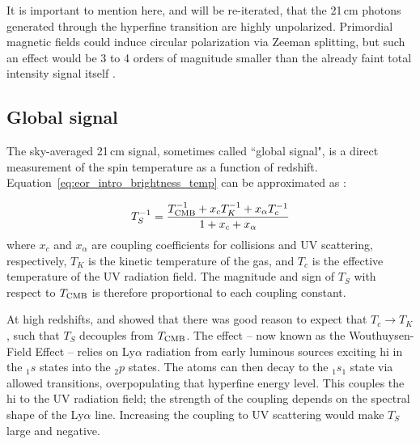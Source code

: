 It is important to mention here, and will be re-iterated, that the 21\,cm photons generated through the hyperfine transition are highly unpolarized. Primordial magnetic fields could induce circular polarization via Zeeman splitting, but such an effect would be 3 to 4 orders of magnitude smaller than the already faint total intensity signal itself \citep[e.g.][also see Chapter~\ref{chapter:astro_rad}]{Babich.05}.



\subsection{Global signal}

The sky-averaged 21\,cm signal, sometimes called ``global signal", is a direct measurement of the spin temperature as a function of redshift. Equation~\ref{eq:eor_intro_brightness_temp} can be approximated as \citep{Field.56}:

\begin{equation}
T_S^{-1} = \frac{T_{\rm CMB}^{-1} + x_cT_K^{-1} + x_{\alpha}T_c^{-1} }{1 + x_c + x_{\alpha}}
\end{equation}
where $x_c$ and $x_{\alpha}$ are coupling coefficients for collisions and UV scattering, respectively, $T_K$ is the kinetic temperature of the gas, and $T_c$ is the effective temperature of the UV radiation field. The magnitude and sign of $T_S$ with respect to $T_{\rm CMB}$ is therefore proportional to each coupling constant.

At high redshifts, \cite{Wouthuysen.52} and \cite{Field.59} showed that there was good reason to expect that $T_c \rightarrow T_K$, such that $T_S$ decouples from $T_{\rm CMB}$. The effect -- now known as the Wouthuysen-Field Effect -- relies on Ly$\alpha$ radiation from early luminous sources exciting {\sc hi} in the ${}_1s$ states into the ${}_2p$ states. The atoms can then decay to the  ${}_1s_1$ state via allowed transitions, overpopulating that hyperfine energy level. This couples the {\sc hi} to the UV radiation field; the strength of the coupling depends on the spectral shape of the Ly$\alpha$ line. Increasing the coupling to UV scattering would make $T_S$ large and negative.

